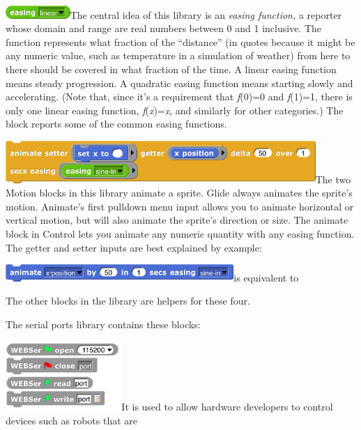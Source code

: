 \includegraphics[width=0.96528in,height=0.19444in]{media/image465.png}The
central idea of this library is an \emph{easing function,} a reporter
whose domain and range are real numbers between 0 and 1 inclusive. The
function represents what fraction of the ``distance'' (in quotes because
it might be any numeric value, such as temperature in a simulation of
weather) from here to there should be covered in what fraction of the
time. A linear easing function means steady progression. A quadratic
easing function means starting slowly and accelerating. (Note that,
since it's a requirement that \emph{f}(0)=0 and \emph{f}(1)=1, there is
only one linear easing function, \emph{f}(\emph{x})=\emph{x}, and
similarly for other categories.) The block reports some of the common
easing functions.

\includegraphics[width=4.63194in,height=0.63194in]{media/image466.png}The
two Motion blocks in this library animate a sprite. Glide always
animates the sprite's motion. Animate's first pulldown menu input allows
you to animate horizontal or vertical motion, but will also animate the
sprite's direction or size. The animate block in Control lets you
animate any numeric quantity with any easing function. The getter and
setter inputs are best explained by example:

\includegraphics[width=3.40972in,height=0.25694in]{media/image467.png}is
equivalent to

The other blocks in the library are helpers for these four.

The serial ports library contains these blocks:

\includegraphics[width=1.73264in,height=1.03472in]{media/image468.png}It
is used to allow hardware developers to control devices such as robots
that are

